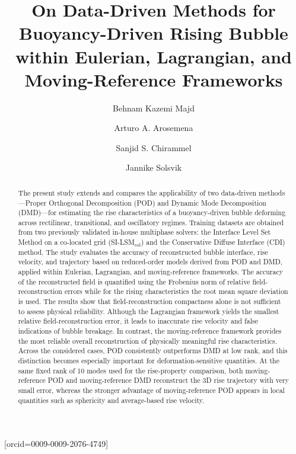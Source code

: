 \documentclass[a4paper,fleqn]{cas-sc}
\begin{document}
	

	

	

	\title[mode=title]{On Data-Driven Methods for Buoyancy-Driven Rising Bubble within Eulerian, Lagrangian, and Moving-Reference Frameworks}  
	
	

	\author[1]{Behnam Kazemi Majd}[orcid=0009-0009-2076-4749]
	\cormark[1]
	
	\author[1]{Arturo A. Arosemena}
	\author[1]{Sanjid S. Chirammel}
	\author[1]{Jannike Solsvik}
	



	
	
	
	\begin{abstract}
		The present study extends and compares the applicability of two data-driven methods—Proper Orthogonal Decomposition (POD) and Dynamic Mode Decomposition (DMD)—for estimating the rise characteristics of a buoyancy-driven bubble deforming across rectilinear, transitional, and oscillatory regimes. Training datasets are obtained from two previously validated in-house multiphase solvers: the  Interface Level Set Method on a co-located grid (SI-LSM$_{\text{col}}$) and the Conservative Diffuse Interface (CDI) method. The study evaluates the accuracy of reconstructed bubble interface, rise velocity, and trajectory based on reduced-order models derived from POD and DMD, applied within Eulerian, Lagrangian, and moving-reference frameworks. The accuracy of the reconstructed field is quantified using the Frobenius norm of relative field-reconstruction errors while for the rising characteristics the root mean square deviation is used. The results show that field-reconstruction compactness alone is not sufficient to assess physical reliability. Although the Lagrangian framework yields the smallest relative field-reconstruction error, it leads to inaccurate rise velocity and false indications of bubble breakage. In contrast, the moving-reference framework provides the most reliable overall reconstruction of physically meaningful rise characteristics. Across the considered cases, POD consistently outperforms DMD at low rank, and this distinction becomes especially important for deformation-sensitive quantities. At the same fixed rank of 10 modes used for the rise-property comparison, both moving-reference POD and moving-reference DMD reconstruct the 3D rise trajectory with very small error, whereas the stronger advantage of moving-reference POD appears in local quantities such as sphericity and average-based rise velocity.
		
	\end{abstract}
	
\end{document}
